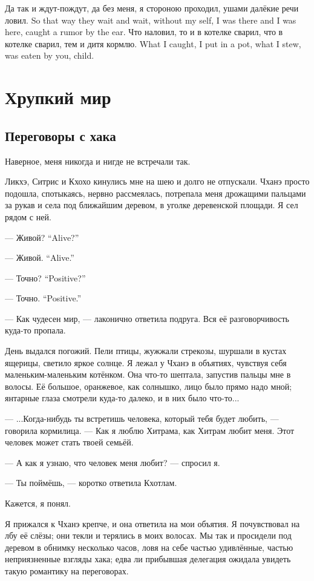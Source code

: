 {Да так и ждут-пождут, да без меня, я стороною проходил, ушами далёкие речи ловил.}
{So that way they wait and wait, without my self, I was there and I was here, caught a rumor by the ear.}
{Что наловил, то и в котелке сварил, что в котелке сварил, тем и дитя кормлю.}
{What I caught, I put in a pot, what I stew, was eaten by you, child.}

\chapter{Хрупкий мир}

\section{Переговоры с хака}

Наверное, меня никогда и нигде не встречали так.

Ликхэ, Ситрис и Кхохо кинулись мне на шею и долго не отпускали.
Чханэ просто подошла, спотыкаясь, нервно рассмеялась, потрепала меня дрожащими пальцами за рукав и села под ближайшим деревом, в уголке деревенской площади.
Я сел рядом с ней.

{--- Живой?}
{``Alive?''}

{--- Живой.}
{``Alive.''}

{--- Точно?}
{``Positive?''}

{--- Точно.}
{``Positive.''}

--- Как чудесен мир, --- лаконично ответила подруга.
Вся её разговорчивость куда-то пропала.

День выдался погожий.
Пели птицы, жужжали стрекозы, шуршали в кустах ящерицы, светило яркое солнце.
Я лежал у Чханэ в объятиях, чувствуя себя маленьким-маленьким котёнком.
Она что-то шептала, запустив пальцы мне в волосы.
Её большое, оранжевое, как солнышко, лицо было прямо надо мной;
янтарные глаза смотрели куда-то далеко, и в них было что-то...

--- ...Когда-нибудь ты встретишь человека, который тебя будет любить, --- говорила кормилица.
--- Как я люблю Хитрама, как Хитрам любит меня.
Этот человек может стать твоей семьёй.

--- А как я узнаю, что человек меня любит? --- спросил я.

--- Ты поймёшь, --- коротко ответила Кхотлам.

Кажется, я понял.

Я прижался к Чханэ крепче, и она ответила на мои объятия.
Я почувствовал на лбу её слёзы;
они текли и терялись в моих волосах.
Мы так и просидели под деревом в обнимку несколько часов, ловя на себе частью удивлённые, частью неприязненные взгляды хака;
едва ли прибывшая делегация ожидала увидеть такую романтику на переговорах.

